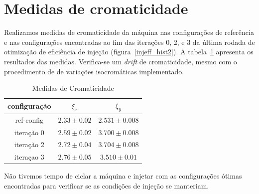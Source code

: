 \documentclass[a4paper,
               keeplastbox,   %
               ]{jacow}
\begin{document}
\section{Medidas de cromaticidade}
Realizamos medidas de cromaticidade da máquina nas configurações de referência e nas configurações encontradas ao fim das iterações 0, 2, e 3 da última rodada de otimização de eficiência de injeção (figura~\ref{injeff_hist2}). A tabela~\ref{chrom} apresenta os resultados das medidas. Verifica-se um \textit{drift} de cromaticidade, mesmo com o procedimento de de variações isocromáticas implementado. 
\begin{table}[h]
\centering
\begin{tabular}{@{}ccc@{}}
\toprule
configuração & $\xi_x$       & $\xi_y$         \\ \midrule
ref-config   & $2.33\pm0.02$ & $2.531\pm0.008$ \\
iteração 0   & $2.59\pm0.02$ & $3.700\pm0.008$   \\
iteração 2   & $2.72\pm0.04$ & $3.704\pm0.008$ \\
iteraçao 3   & $2.76\pm0.05$  & $3.510\pm0.01$   \\ \bottomrule
\end{tabular}
\caption{Medidas de Cromaticidade}
\label{chrom}
\end{table}

Não tivemos tempo de ciclar a máquina e injetar com as configurações ótimas encontradas para verificar se as condições de injeção se manteriam.

\end{document}
